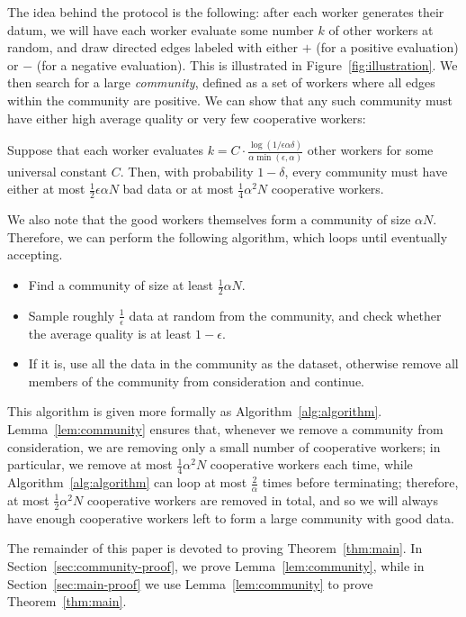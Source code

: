 \documentclass[anon,12pt]{colt2016} %
\newcommand{\goodfrac}{\alpha}
\newcommand{\quality}{\epsilon}
\newcommand{\failprob}{\delta}
\begin{document}
The idea behind the protocol is the following: after each worker generates their 
datum, we will have each worker evaluate some number $k$ of other workers at 
random, and draw directed edges labeled with either $+$ (for a positive 
evaluation) or $-$ (for a negative evaluation). This is illustrated in 
Figure~\ref{fig:illustration}. We then search for a large \emph{community}, 
defined as a set of workers where all edges within the community are positive. 
We can show that any such community must have either high average quality 
or very few cooperative workers:
\begin{lemma}
\label{lem:community}
Suppose that each worker evaluates $k = C \cdot \frac{\log(1/\quality\goodfrac\failprob)}{\goodfrac\min(\quality,\goodfrac)}$ 
other workers for some universal constant $C$. 
Then, with probability $1-\delta$, every 
community must have either at most $\frac{1}{2}\quality\goodfrac N$ bad data 
or at most $\frac{1}{4}\goodfrac^2 N$ cooperative workers.
\end{lemma}
We also note that the good workers themselves form a community of size 
$\goodfrac N$. Therefore, we can perform the following algorithm, which loops 
until eventually accepting.
\begin{itemize}
\item Find a community of size at least $\frac{1}{2}\goodfrac N$.
\item Sample roughly $\frac{1}{\quality}$ data at random from the community, 
      and check whether the average quality is at least $1-\quality$.
\item If it is, use all the data in the community as the dataset, 
      otherwise remove all members of the community from consideration 
      and continue.
\end{itemize}
This algorithm is given more formally as Algorithm~\ref{alg:algorithm}. 
Lemma~\ref{lem:community} ensures that, whenever we remove a community 
from consideration, we are removing only a small number of cooperative 
workers; in particular, we remove at most $\frac{1}{4}\goodfrac^2 N$ cooperative 
workers each time, while Algorithm~\ref{alg:algorithm} can loop at most 
$\frac{2}{\goodfrac}$ times before terminating; therefore, at most 
$\frac{1}{2}\goodfrac^2 N$ cooperative workers are removed in total, and 
so we will always have enough cooperative workers left to form a large 
community with good data.

The remainder of this paper is devoted to proving Theorem~\ref{thm:main}. 
In Section~\ref{sec:community-proof}, we prove Lemma~\ref{lem:community}, 
while in Section~\ref{sec:main-proof} we use Lemma~\ref{lem:community} 
to prove Theorem~\ref{thm:main}.
\end{document}
